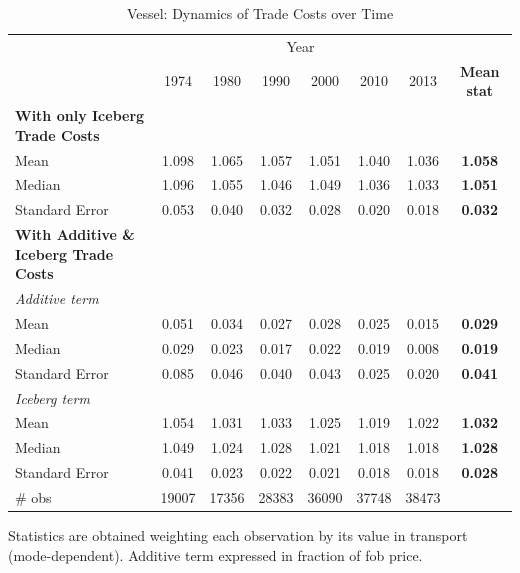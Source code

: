 \documentclass[a4paper,11pt]{article}
\begin{document}
\begin{table}[htbp]
  \centering
  \caption{Vessel: Dynamics of Trade Costs over Time}
\begin{center}
    \begin{tabular}{lccccccc}

   \hline\hline
          & \multicolumn{6}{c}{Year}                      &  \\

          & 1974  & 1980  & 1990  & 2000  & 2010  & 2013  & \multicolumn{1}{c}{\textbf{Mean stat}} \\
 \hline
   \textbf{With only Iceberg Trade Costs} &       &       &       &       &       &       & \textbf{} \\
Mean  & 1.098 & 1.065 & 1.057 & 1.051 & 1.040 & 1.036 & \textbf{1.058} \\
Median & 1.096 & 1.055 & 1.046 & 1.049 & 1.036 & 1.033 & \textbf{1.051} \\
Standard Error & 0.053 & 0.040 & 0.032 & 0.028 & 0.020 & 0.018 & \textbf{0.032} \\
\textbf{With Additive \& Iceberg Trade Costs} &       &       &       &       &       &       & \textbf{} \\
\hline
\textit{Additive term } &       &       &       &       &       &       & \textbf{} \\
Mean  & 0.051 & 0.034 & 0.027 & 0.028 & 0.025 & 0.015 & \textbf{0.029} \\
Median & 0.029 & 0.023 & 0.017 & 0.022 & 0.019 & 0.008 & \textbf{0.019} \\
Standard Error & 0.085 & 0.046 & 0.040 & 0.043 & 0.025 & 0.020 & \textbf{0.041} \\
\textit{Iceberg term} &       &       &       &       &       &       & \textbf{} \\
Mean  & 1.054 & 1.031 & 1.033 & 1.025 & 1.019 & 1.022 & \textbf{1.032} \\
Median & 1.049 & 1.024 & 1.028 & 1.021 & 1.018 & 1.018 & \textbf{1.028} \\
Standard Error & 0.041 & 0.023 & 0.022 & 0.021 & 0.018 & 0.018 & \textbf{0.028} \\
\hline
\# obs & 19007 & 17356 & 28383 & 36090 & 37748 & 38473 & \textbf{} \\


\hline\hline
    \end{tabular}%
  \end{center}
  \label{tab:result_ves}%
\tiny{Statistics are obtained weighting each observation by its value in transport (mode-dependent). Additive term expressed in fraction of fob price. }
\end{table}%
\end{document}
